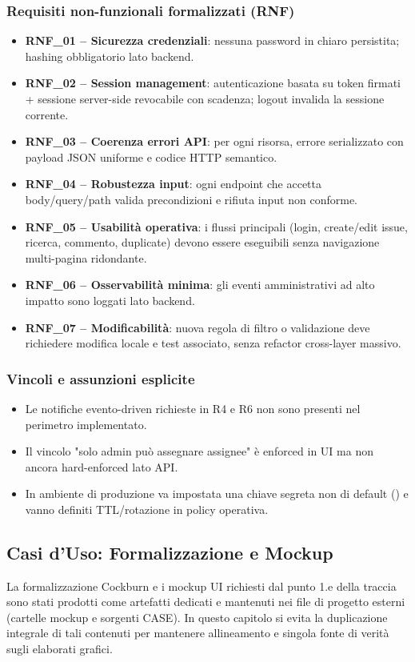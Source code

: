﻿\documentclass[11pt,a4paper]{article}
\newcommand{\code}[1]{\texttt{\seqsplit{#1}}}
\begin{document}
\subsubsection*{Requisiti non-funzionali formalizzati (RNF)}
\begin{itemize}
    \item \textbf{RNF\_01 -- Sicurezza credenziali}: nessuna password in chiaro persistita; hashing obbligatorio lato backend.
    \item \textbf{RNF\_02 -- Session management}: autenticazione basata su token firmati + sessione server-side revocabile con scadenza; logout invalida la sessione corrente.
    \item \textbf{RNF\_03 -- Coerenza errori API}: per ogni risorsa, errore serializzato con payload JSON uniforme e codice HTTP semantico.
    \item \textbf{RNF\_04 -- Robustezza input}: ogni endpoint che accetta body/query/path valida precondizioni e rifiuta input non conforme.
    \item \textbf{RNF\_05 -- Usabilità operativa}: i flussi principali (login, create/edit issue, ricerca, commento, duplicate) devono essere eseguibili senza navigazione multi-pagina ridondante.
    \item \textbf{RNF\_06 -- Osservabilità minima}: gli eventi amministrativi ad alto impatto sono loggati lato backend.
    \item \textbf{RNF\_07 -- Modificabilità}: nuova regola di filtro o validazione deve richiedere modifica locale e test associato, senza refactor cross-layer massivo.
\end{itemize}

\subsubsection*{Vincoli e assunzioni esplicite}
\begin{itemize}
    \item Le notifiche evento-driven richieste in R4 e R6 non sono presenti nel perimetro implementato.
    \item Il vincolo "solo admin può assegnare assignee" è enforced in UI ma non ancora hard-enforced lato API.
    \item In ambiente di produzione va impostata una chiave segreta non di default (\code{AUTH\_TOKEN\_SECRET}) e vanno definiti TTL/rotazione in policy operativa.
\end{itemize}

\subsection{Casi d'Uso: Formalizzazione e Mockup}
La formalizzazione Cockburn e i mockup UI richiesti dal punto 1.e della traccia sono stati prodotti come artefatti dedicati e mantenuti nei file di progetto esterni (cartelle mockup e sorgenti CASE). In questo capitolo si evita la duplicazione integrale di tali contenuti per mantenere allineamento e singola fonte di verità sugli elaborati grafici.
\end{document}
